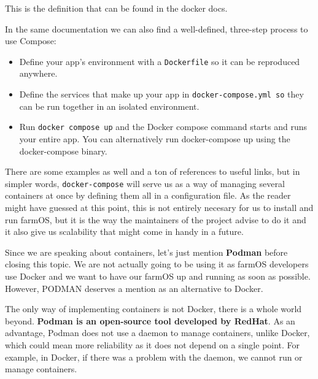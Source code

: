 This is the definition that can be found in the docker docs.


\vspace{5mm}
In the same documentation we can also find a well-defined, three-step process to use Compose:
\begin{itemize}
	\item Define your app’s environment with a \verb|Dockerfile|\cite{dockerfile} so it can be reproduced anywhere.
	\item Define the services that make up your app in \verb|docker-compose.yml so| they can be run together in an isolated environment.
	\item Run \verb|docker compose up| and the Docker compose command starts and runs your entire app. You can alternatively run docker-compose up using the docker-compose binary.
\end{itemize}

\vspace{7mm}
There are some examples as well and a ton of references to useful links, but in simpler words, \verb|docker-compose| will serve us as a way of managing several containers at once by defining them all in a configuration file. As the reader might have guessed at this point, this is not entirely necesary for us to install and run farmOS, but it is the way the maintainers of the project advise to do it and it also give us scalability that might come in handy in a future.

\vspace{7mm}
Since we are speaking about containers, let's just mention \textbf{Podman}\cite{podman} before closing this topic. We are not actually going to be using it as farmOS developers use Docker and we want to have our farmOS up and running as soon as possible. However, PODMAN deserves a mention as an alternative to Docker.

\vspace{7mm}
The only way of implementing containers is not Docker, there is a whole world beyond. \textbf{Podman is an open-source tool developed by RedHat}. As an advantage, Podman does not use a daemon to manage containers, unlike Docker, which could mean more reliability as it does not depend on a single point. For example, in Docker, if there was a problem with the daemon, we cannot run or manage containers.

